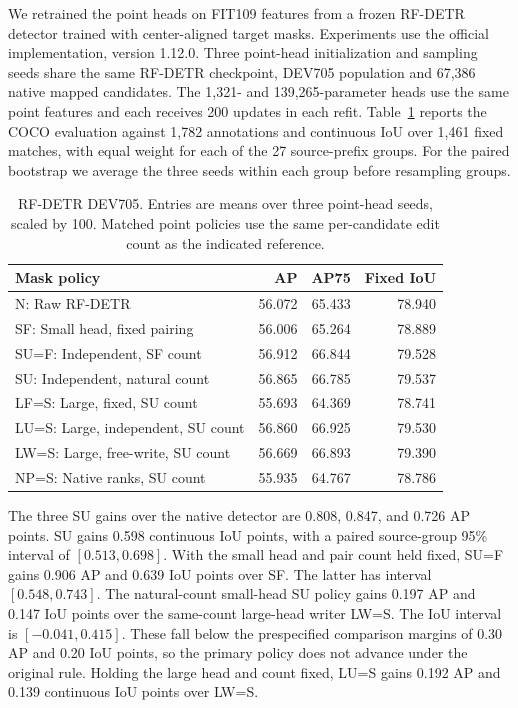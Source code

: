 \documentclass[journal]{IEEEtran}
\begin{document}
We retrained the point heads on FIT109 features from a frozen RF-DETR~\cite{rfdetr} detector trained with center-aligned target masks. Experiments use the official implementation, version 1.12.0. Three point-head initialization and sampling seeds share the same RF-DETR checkpoint, DEV705 population and 67,386 native mapped candidates. The 1,321- and 139,265-parameter heads use the same point features and each receives 200 updates in each refit. Table~\ref{tab:rfdetr} reports the COCO evaluation against 1,782 annotations and continuous IoU over 1,461 fixed matches, with equal weight for each of the 27 source-prefix groups. For the paired bootstrap we average the three seeds within each group before resampling groups.

\begin{table}[t]
\centering
\caption{RF-DETR DEV705. Entries are means over three point-head seeds, scaled by 100. Matched point policies use the same per-candidate edit count as the indicated reference.}
\label{tab:rfdetr}
\footnotesize
\begin{tabular}{@{}lrrr@{}}
\toprule
Mask policy & AP & AP75 & Fixed IoU\\
\midrule
N: Raw RF-DETR & 56.072 & 65.433 & 78.940\\
SF: Small head, fixed pairing & 56.006 & 65.264 & 78.889\\
SU=F: Independent, SF count & 56.912 & 66.844 & 79.528\\
SU: Independent, natural count & 56.865 & 66.785 & 79.537\\
LF=S: Large, fixed, SU count & 55.693 & 64.369 & 78.741\\
LU=S: Large, independent, SU count & 56.860 & 66.925 & 79.530\\
LW=S: Large, free-write, SU count & 56.669 & 66.893 & 79.390\\
NP=S: Native ranks, SU count & 55.935 & 64.767 & 78.786\\
\bottomrule
\end{tabular}
\end{table}

The three SU gains over the native detector are 0.808, 0.847, and 0.726 AP points. SU gains 0.598 continuous IoU points, with a paired source-group 95\% interval of \([0.513,0.698]\). With the small head and pair count held fixed, SU=F gains 0.906 AP and 0.639 IoU points over SF. The latter has interval \([0.548,0.743]\). The natural-count small-head SU policy gains 0.197 AP and 0.147 IoU points over the same-count large-head writer LW=S. The IoU interval is \([-0.041,0.415]\). These fall below the prespecified comparison margins of 0.30 AP and 0.20 IoU points, so the primary policy does not advance under the original rule. Holding the large head and count fixed, LU=S gains 0.192 AP and 0.139 continuous IoU points over LW=S.
\end{document}
